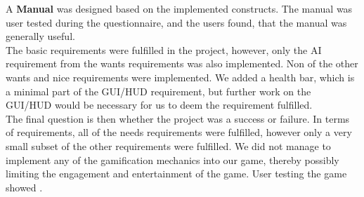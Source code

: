 A \textbf{Manual} was designed based on the implemented constructs. The manual was user tested during the questionnaire, and the users found, that the manual was generally useful.\\

The basic requirements were fulfilled in the project, however, only the AI requirement from the wants requirements was also implemented. Non of the other wants and nice requirements were implemented. We added a health bar, which is a minimal part of the GUI/HUD requirement, but further work on the GUI/HUD would be necessary for us to deem the requirement fulfilled.\\

The final question is then whether the project was a success or failure. In terms of requirements, all of the needs requirements were fulfilled, however only a very small subset of the other requirements were fulfilled. We did not manage to implement any of the gamification mechanics into our game, thereby possibly limiting the engagement and entertainment of the game. User testing the game showed .